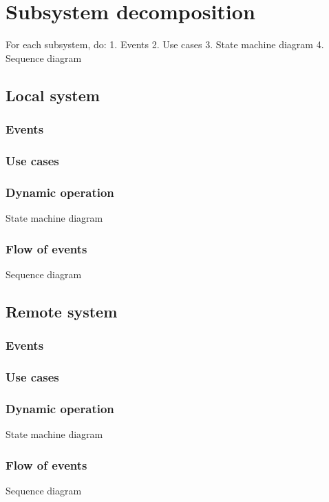 
\section{Subsystem decomposition}
\label{sec:subsyst-decomp}

For each subsystem, do:
1. Events
2. Use cases
3. State machine diagram
4. Sequence diagram

\subsection{Local system}
\label{sec:local-system}

\subsubsection{Events}
\label{sec:events}

\subsubsection{Use cases}
\label{sec:use-cases}

\subsubsection{Dynamic operation}
\label{sec:dyn-oper}
State machine diagram

\subsubsection{Flow of events}
\label{sec:flow-events}
Sequence diagram

\subsection{Remote system}
\label{sec:remote-system}

\subsubsection{Events}
\label{sec:events-1}

\subsubsection{Use cases}
\label{sec:use-cases-1}

\subsubsection{Dynamic operation}
\label{sec:dyn-oper-1}
State machine diagram

\subsubsection{Flow of events}
\label{sec:flow-events-1}
Sequence diagram


